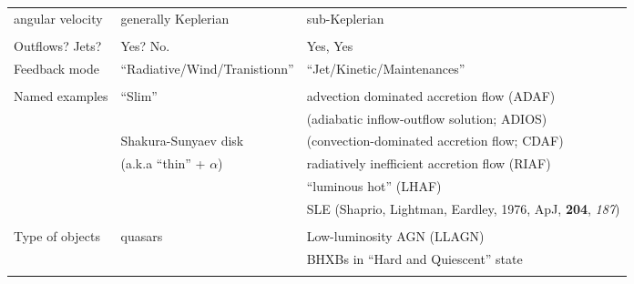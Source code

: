 \documentclass[11pt,a4paper]{article}
\begin{document}
\begin{landscape}
\begin{table}[]
\begin{tabular}{  p{50mm}   p{60mm}   p{100mm}  }
      angular velocity                               & generally  Keplerian                                    & sub-Keplerian \\
      &  &  \\
      Outflows? Jets?                               & Yes? No.                                          & Yes, Yes \\
      Feedback mode                               & ``Radiative/Wind/Tranistionn''                 & ``Jet/Kinetic/Maintenances'' \\
      & & \\
    Named examples                           &   ``Slim''                        & advection dominated accretion flow (ADAF)\\
                                                           &                                             & (adiabatic inflow-outflow solution; ADIOS) \\
                                                           &   Shakura-Sunyaev disk                & (convection-dominated accretion flow; CDAF) \\
                                                           &   (a.k.a ``thin'' + $\alpha$)                    & radiatively inefficient accretion flow (RIAF)\\
                                                           &                                                         & ``luminous hot''  (LHAF)\\
                                                          &                                                          & SLE (Shaprio, Lightman, Eardley, 1976, ApJ, {\bf 204}, {\it 187})   \\ 
      & & \\
  Type of objects            & quasars                                           & Low-luminosity AGN (LLAGN) \\
                                                               &                                                      & BHXBs in ``Hard and Quiescent'' state \\      
& & \\
    \hline
    \hline
\end{tabular}
\end{table}
\end{landscape}
\end{document}
